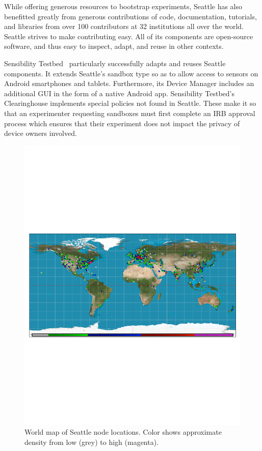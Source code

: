 While offering generous resources to bootstrap experiments,
Seattle has also benefitted greatly from generous contributions
of code, documentation, tutorials, and libraries from over 100
contributors at 32 institutions all over the world.
Seattle strives to make contributing easy. All of its components
are open-source software, and thus easy to inspect, adapt, and
reuse in other contexts.

Sensibility Testbed~\cite{zhuang2014sensibility} particularly
successfully adapts and reuses Seattle components. It extends
Seattle's sandbox type so as to allow access
to sensors on Android smartphones and tablets. Furthermore, its
Device Manager includes an additional \gls{GUI} in the form of
a native Android app. Sensibility Testbed's Clearinghouse implements
special policies not found in Seattle. These make it so that
an experimenter requesting sandboxes must first complete
an \gls{IRB} approval process which ensures that their experiment
does not impact the privacy of device owners involved.


\begin{figure}
  \centering
  \includegraphics[width=\columnwidth]{figures/finishedmap_ipinfo_small.pdf}
  \caption{World map of Seattle node locations. Color shows approximate density from low (grey) to high (magenta).}
  \label{fig:map}
\end{figure}
